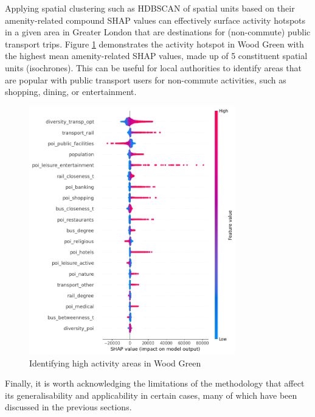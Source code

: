 Applying spatial clustering such as HDBSCAN of spatial units based on their amenity-related compound SHAP values can effectively surface activity hotspots in a given area in Greater London that are destinations for (non-commute) public transport trips. Figure \ref{fig:woodgreen} demonstrates the activity hotspot in Wood Green with the highest mean amenity-related SHAP values, made up of 5 constituent spatial units (isochrones). This can be useful for local authorities to identify areas that are popular with public transport users for non-commute activities, such as shopping, dining, or entertainment.

\begin{figure}[!ht]
    \centering
    \includegraphics[width=0.8\textwidth]{output.png}
    \captionsetup{justification=centering}
    \caption{Identifying high activity areas in Wood Green}
    \label{fig:woodgreen}
\end{figure}

Finally, it is worth acknowledging the limitations of the methodology that affect its generalisability and applicability in certain cases, many of which have been discussed in the previous sections.

